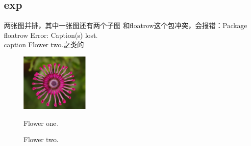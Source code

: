 \documentclass{article}
\begin{document}
\begin{CJK}{UTF8}{gbsn}
	

	
\section{exp}


两张图并排，其中一张图还有两个子图
和floatrow这个包冲突，会报错：Package floatrow Error: Caption(s) lost. \\caption Flower two.之类的
\begin{figure}[!tbp]
	\setlength{\abovecaptionskip}{0pt}
	\setlength{\belowcaptionskip}{0pt}
	\centering
	\begin{minipage}[b]{0.4\textwidth}
		\includegraphics[width=\textwidth]{imgs/flower1.png}
		\caption{Flower one.}
	\end{minipage}
	\hfill %
	\begin{minipage}[b]{0.55\textwidth}
		\caption{Flower two.}
	\end{minipage}
\end{figure}




\end{CJK}
\end{document}
